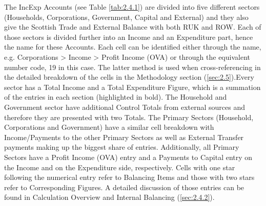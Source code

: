 The IncExp Accounts (see Table \ref{tab:2.4.1}) are divided into five different sectors (Households, Corporations, Government, Capital and External) and they also give the Scottish Trade and External Balance with both RUK and ROW. Each of those sectors is divided further into an Income and an Expenditure part, hence the name for these Accounts. Each cell can be identified either through the name, e.g. Corporations > Income > Profit Income (OVA) or through the equivalent number code, 19 in this case. The latter method is used when cross-referencing in the detailed breakdown of the cells in the Methodology section (\ref{sec:2.5}).Every sector has a Total Income and a Total Expenditure Figure, which is a summation of the entries in each section (highlighted in bold). The Household and Government sector have additional Control Totals from external sources and therefore they are presented with two Totals. The Primary Sectors (Household, Corporations and Government) have a similar cell breakdown with Income/Payments to the other Primary Sectors as well as External Transfer payments making up the biggest share of entries. Additionally, all Primary Sectors have a Profit Income (OVA) entry and a Payments to Capital entry on the Income and on the Expenditure side, respectively. Cells with one star following the numerical entry refer to Balancing Items and those with two stars refer to Corresponding Figures. A detailed discussion of those entries can be found in Calculation Overview and Internal Balancing (\ref{sec:2.4.2}).




